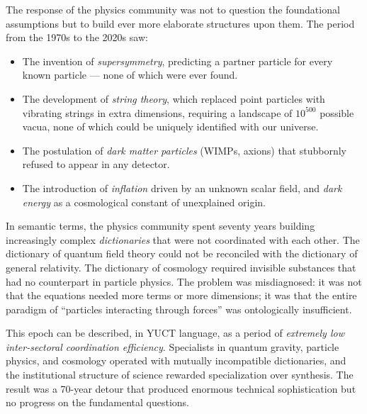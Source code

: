 \documentclass[12pt,a4paper]{article}
\begin{document}
	The response of the physics community was not to question the foundational assumptions but to build ever more elaborate structures upon them. The period from the 1970s to the 2020s saw:
	\begin{itemize}
		\item The invention of \emph{supersymmetry}, predicting a partner particle for every known particle --- none of which were ever found.
		\item The development of \emph{string theory}, which replaced point particles with vibrating strings in extra dimensions, requiring a landscape of \(10^{500}\) possible vacua, none of which could be uniquely identified with our universe.
		\item The postulation of \emph{dark matter particles} (WIMPs, axions) that stubbornly refused to appear in any detector.
		\item The introduction of \emph{inflation} driven by an unknown scalar field, and \emph{dark energy} as a cosmological constant of unexplained origin.
	\end{itemize}
	
	In semantic terms, the physics community spent seventy years building increasingly complex \emph{dictionaries} that were not coordinated with each other. The dictionary of quantum field theory could not be reconciled with the dictionary of general relativity. The dictionary of cosmology required invisible substances that had no counterpart in particle physics. The problem was misdiagnosed: it was not that the equations needed more terms or more dimensions; it was that the entire paradigm of ``particles interacting through forces'' was ontologically insufficient.
	
	This epoch can be described, in YUCT language, as a period of \emph{extremely low inter-sectoral coordination efficiency}. Specialists in quantum gravity, particle physics, and cosmology operated with mutually incompatible dictionaries, and the institutional structure of science rewarded specialization over synthesis. The result was a 70-year detour that produced enormous technical sophistication but no progress on the fundamental questions.
	
\end{document}
